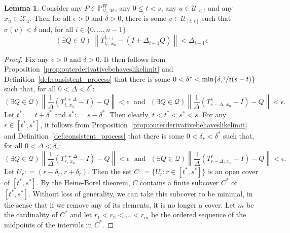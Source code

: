 \documentclass[10pt,a4paper]{paper}
\theoremstyle{definition}
\newtheorem{lemma}[theorem]{Lemma}
\newcommand{\states}{\mathcal{X}}
\newcommand{\processes}{\mathbb{P}}
\newcommand{\wprocesses}{\processes^{\mathrm{W}}}
\newcommand{\rateset}{\mathcal{Q}}
\newcommand{\norm}[1]{\left\lVert #1 \right\rVert}
\newcommand{\coloneqq}{:\!=}
\begin{document}
\begin{lemma}\label{lemma:bound_on_linear_approx_partition}
Consider any $P\in\wprocesses_{\rateset,\,\mathcal{M}}$, any $0\leq t<s$, any $u\in\mathcal{U}_{<t}$ and any $x_u\in\states_u$. Then for all $\epsilon>0$ and $\delta>0$, there is some $v\in\mathcal{U}_{[t,s]}$ such that $\sigma(v)<\delta$ and, for all $i\in\{0,\dots,n-1\}$:
\begin{equation*}
(\exists Q\in\rateset)
~
\norm{
T^{t_{i+1}}_{t_i,\,x_u}-(I+\Delta_{i+1}Q)
}<\Delta_{i+1}\epsilon
\end{equation*}
\end{lemma}
\begin{proof}
Fix any $\epsilon>0$ and $\delta>0$. It then follows from Proposition~\ref{prop:outerderivativebehaveslikelimit} and Definition~\ref{def:consistent_process} that there is some $0<\delta^*<\min\{\delta,\nicefrac{1}{2}(s-t)\}$ such that, for all $0<\Delta<\delta^*$:
\begin{equation}\label{eq:epsilonboundsforboundsinlemma}
(\exists Q\in\rateset)
\norm{\frac{1}{\Delta}
(T^{t+\Delta}_{t,\,x_u}-I)-Q}<\epsilon
\text{~~and~~}
(\exists Q\in\rateset)
\norm{\frac{1}{\Delta}
(T^{s}_{s-\Delta,\,x_u}-I)-Q}<\epsilon.
\end{equation}
Let $t^*\coloneqq t+\delta^*$ and $s^*\coloneqq s-\delta^*$. Then clearly, $t<t^*<s^*<s$.
For any $r\in[t^*,s^*]$, it follows from Proposition~\ref{prop:outerderivativebehaveslikelimit} and Definition~\ref{def:consistent_process} that there is some $0<\delta_r<\delta^*$ such that, for all $0<\Delta<\delta_r$:
\begin{equation}\label{eq:epsilonboundsforlemma}
(\exists Q\in\rateset)
\norm{\frac{1}{\Delta}
(T^{r+\Delta}_{r,\,x_u}-I)-Q}<\epsilon
\text{~~and~~}
(\exists Q\in\rateset)
\norm{\frac{1}{\Delta}
(T^{r}_{r-\Delta,\,x_u}-I)-Q}<\epsilon.
\end{equation}
Let $U_r\coloneqq(r-\delta_r,r+\delta_r)$. Then the set $C\coloneqq\{U_r\colon r\in[t^*,s^*]\}$ is an open cover of $[t^*,s^*]$. By the Heine-Borel theorem, $C$ contains a finite subcover $C^*$ of $[t^*,s^*]$. Without loss of generality, we can take this subcover to be minimal, in the sense that if we remove any of its elements, it is no longer a cover. Let $m$ be the cardinality of $C^*$ and let $r_1<r_2<\dots<r_m$ be the ordered sequence of the midpoints of the intervals in $C^*$.


\end{proof}
\end{document}
